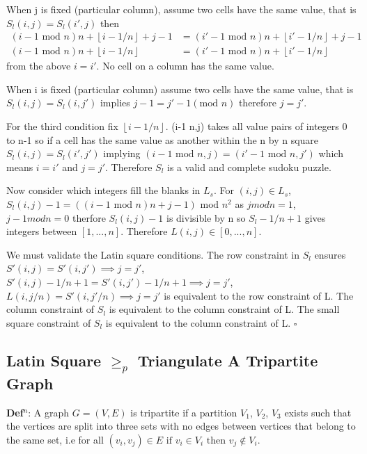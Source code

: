 \documentclass[a4paper,11pt]{report}
\newcounter{row}
\newcounter{col}
\begin{document}
When j is fixed (particular column), assume two cells have the same value, that is $S_l(i,j)=S_l(i',j)$ then
\begin{align}
(i-1 \text{ mod } n)n + \left\lfloor{i-1/n}\right\rfloor+j-1 &= (i'-1 \text{ mod } n)n +
\left\lfloor{i'-1/n}\right\rfloor+j-1\\
	(i-1 \text{ mod } n)n + \left\lfloor{i-1/n}\right\rfloor &= (i'-1 \text{ mod } n)n + \left\lfloor{i'-1/n}\right\rfloor
\end{align}
from the above $i=i'$. No cell on a column has the same value.

When i is fixed (particular column) assume two cells have the same value, that is $S_l(i,j)=S_l(i,j')$ implies $j-1=j'-1 (\text{mod }n)$ therefore $j=j'$.

For the third condition fix $\left\lfloor{i-1/n}\right\rfloor$. (i-1  n,j) takes all value pairs of integers 0 to n-1 so if a cell has the same value as another within the n by n square $S_l(i,j)=S_l(i',j')$ implying $(i-1 \text{ mod }n,j)=(i'-1 \text{ mod } n,j')$ which means $i=i'$ and $j=j'$. Therefore $S_l$ is a valid and complete sudoku puzzle.

Now consider which integers fill the blanks in $L_s$. For $(i,j)\in L_s$, $S_l(i,j)-1= ((i-1 \text{ mod } n)n+j-1)\text{ mod } n^2$ as $j mod n=1$, $j-1modn=0$ therfore $S_l(i,j)-1$ is divisible by n so $S_l-1/n+1$ gives integers between $[1,...,n]$.
Therefore $L(i,j) \in [0,...,n]$.

We must validate the Latin square conditions. The row constraint in $S_l$ ensures $S'(i,j)=S'(i,j') \implies j=j'$, $S'(i,j)-1/n+1=S'(i,j')-1/n+1 \implies j=j'$, $L(i,j/n)=S'(i,j'/n) \implies j=j'$ is equivalent to the row constraint of L. The column constraint of $S_l$ is equivalent to the column constraint of L. The small square constraint of $S_l$ is equivalent to the column constraint of L. $\square$




\subsection{Latin Square $\geq_p$ Triangulate A Tripartite Graph}

\textbf{Def$^n$}: A graph $G=(V,E)$ is tripartite if a partition $V_1$, $V_2$, $V_3$ exists such that the vertices are split into three sets with no edges between vertices that belong to the same set, i.e for all $(v_i,v_j) \in E\text{ if } v_i \in V_i\text{ then }v_j \not\in V_i $.
\end{document}
